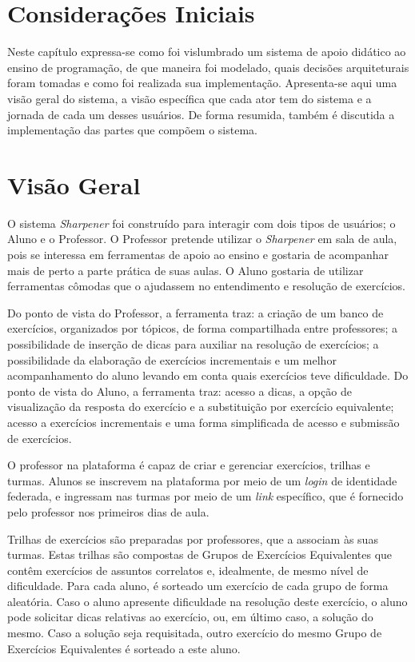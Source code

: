 \label{chapter:desenvolvimento}
\section{Considerações Iniciais}
Neste capítulo expressa-se como foi vislumbrado um sistema de apoio didático ao ensino de programação, de que maneira foi modelado, 
quais decisões arquiteturais foram tomadas e como foi realizada sua implementação. Apresenta-se aqui uma visão geral do sistema, a visão específica que cada ator tem do sistema e a jornada de cada um desses usuários. De forma resumida, também é discutida a implementação das partes que compõem o sistema.
\section{Visão Geral}
O sistema \emph{Sharpener} foi construído para interagir com dois tipos de usuários; o Aluno e o Professor. O Professor pretende utilizar o \emph{Sharpener}
 em sala de aula, pois se interessa em ferramentas de apoio ao ensino e gostaria de acompanhar mais de perto a parte prática de suas aulas. O Aluno 
gostaria de utilizar ferramentas cômodas que o ajudassem no entendimento e resolução de exercícios.

Do ponto de vista do Professor, a ferramenta traz: a criação de um banco de exercícios, organizados por tópicos, 
de forma compartilhada entre professores; a possibilidade de inserção de dicas para auxiliar na resolução de exercícios; 
a possibilidade da elaboração de exercícios incrementais e um melhor acompanhamento do aluno levando em conta quais exercícios teve dificuldade. 
Do ponto de vista do Aluno, a ferramenta traz:  acesso a dicas, a opção de visualização da resposta do exercício e a substituição por exercício equivalente;
acesso a exercícios incrementais e uma forma 
simplificada de acesso e submissão de exercícios.

O professor na plataforma é capaz de criar e gerenciar exercícios, trilhas e turmas. 
Alunos se inscrevem na plataforma por meio de um \emph{login} de identidade federada, e 
ingressam nas turmas por meio de um \emph{link} específico, que é fornecido 
pelo professor nos primeiros dias de aula. 

Trilhas de exercícios são preparadas por professores, que a associam às suas turmas. 
Estas trilhas são compostas de Grupos de Exercícios Equivalentes que 
contêm exercícios de assuntos correlatos e, idealmente, de mesmo nível de dificuldade.
Para cada aluno, é sorteado um exercício de cada grupo de forma aleatória. 
Caso o aluno apresente dificuldade na resolução deste exercício, o aluno pode solicitar 
dicas relativas ao exercício, ou, em último caso, a solução do mesmo. Caso a solução 
seja requisitada, outro exercício do mesmo Grupo de Exercícios Equivalentes é sorteado a este aluno.

